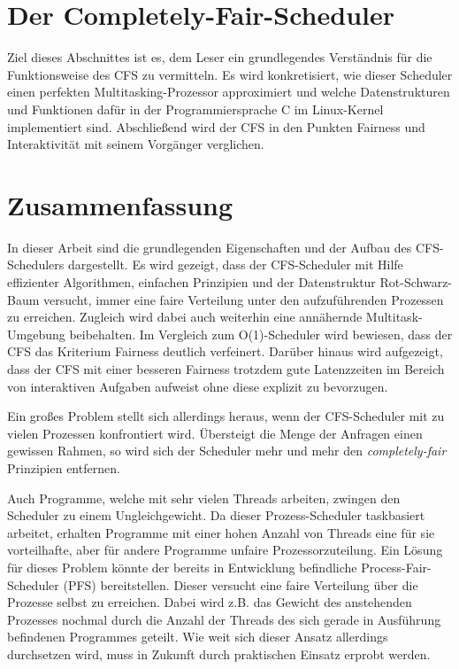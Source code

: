 \documentclass[ngerman]{seminarvorlage}
\begin{document}






\section{Der Completely-Fair-Scheduler}\label{s:cfsmain}
Ziel dieses Abschnittes ist es, dem Leser ein grundlegendes Verständnis für die Funktionsweise des CFS zu vermitteln. Es wird konkretisiert, wie dieser Scheduler einen perfekten Multitasking-Prozessor approximiert und welche Datenstrukturen und Funktionen dafür in der Programmiersprache C im Linux-Kernel implementiert sind. Abschließend wird der CFS in den Punkten Fairness und Interaktivität mit seinem Vorgänger verglichen.





\section{Zusammenfassung}\label{s:end}
In dieser Arbeit sind die grundlegenden Eigenschaften und der Aufbau des CFS-Schedulers dargestellt. Es wird gezeigt, dass der CFS-Scheduler mit Hilfe effizienter Algorithmen, einfachen Prinzipien und der Datenstruktur Rot-Schwarz-Baum versucht, immer eine faire Verteilung unter den aufzuführenden Prozessen zu erreichen. Zugleich wird dabei auch weiterhin eine annähernde Multitask-Um\-gebung beibehalten. Im Vergleich zum O(1)-Scheduler wird bewiesen, dass der CFS das Kriterium Fairness deutlich verfeinert. Darüber hinaus wird aufgezeigt, dass der CFS mit einer besseren Fairness trotzdem gute Latenzzeiten im Bereich von interaktiven Aufgaben aufweist ohne diese explizit zu bevorzugen.

Ein großes Problem stellt sich allerdings heraus, wenn der CFS-Scheduler mit zu vielen Prozessen konfrontiert wird. Über\-steigt die Menge der Anfragen einen gewissen Rahmen, so wird sich der Scheduler mehr und mehr den  \textit{com\-pletely-fair} Prinzipien entfernen.  

Auch Programme, welche mit sehr vielen Threads arbeiten, zwingen den Scheduler zu einem Ungleichgewicht. Da dieser Prozess-Scheduler taskbasiert arbeitet, erhalten Programme mit einer hohen Anzahl von Threads eine für sie vorteilhafte, aber für andere Programme unfaire Prozessorzuteilung. Ein Lösung für dieses Problem könnte der bereits in Entwicklung befindliche Process-Fair-Sched\-uler (PFS) bereitstellen. Dieser versucht eine faire Verteilung über die Prozesse selbst zu erreichen. Dabei wird z.B. das Gewicht des anstehenden Prozesses nochmal durch die Anzahl der Threads des sich gerade in Ausführung befindenen Programmes geteilt. Wie weit sich dieser Ansatz allerdings durchsetzen wird, muss in Zukunft durch praktischen Einsatz erprobt werden.
\end{document}
